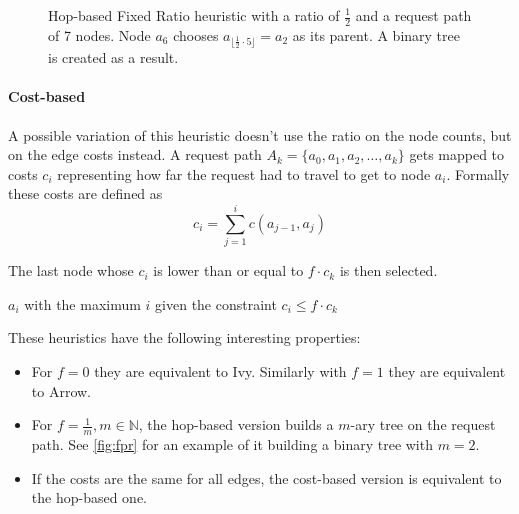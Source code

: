 \documentclass[a4paper, oneside]{discothesis}
\begin{document}
\begin{figure}[H]
\centering
{}
\caption{Hop-based Fixed Ratio heuristic with a ratio of $\frac{1}{2}$ and a request path of 7 nodes. Node $a_{6}$ chooses $a_{\lfloor \frac{1}{2}\cdot 5 \rfloor}=a_{2}$ as its parent. A binary tree is created as a result.}
\label{fig:fpr}
\end{figure}

\paragraph{Cost-based}\label{alg:frc}

A possible variation of this heuristic doesn't use the ratio on the node counts, but on the edge costs instead. A request path $A_k=\{a_{0},a_{1},a_{2},\dots,a_{k}\}$ gets mapped to costs $c_i$ representing how far the request had to travel to get to node $a_i$. Formally these costs are defined as
\begin{equation}
c_i=\sum_{j=1}^ic(a_{j-1},a_{j})
\end{equation}

The last node whose $c_i$ is lower than or equal to $f\cdot c_k$ is then selected.

\begin{algorithmic}
\State\Return $a_{i}$ with the maximum $i$ given the constraint $c_i\leq f\cdot c_k$ 
\EndFunction
\end{algorithmic}

These heuristics have the following interesting properties:
\begin{itemize}
\item For $f=0$ they are equivalent to Ivy. Similarly with $f=1$ they are equivalent to Arrow.
\item For $f=\frac{1}{m}, m\in\mathbb{N}$, the hop-based version builds a $m$-ary tree on the request path. See \autoref{fig:fpr} for an example of it building a binary tree with $m=2$.
\item If the costs are the same for all edges, the cost-based version is equivalent to the hop-based one.
\end{itemize}
\end{document}
